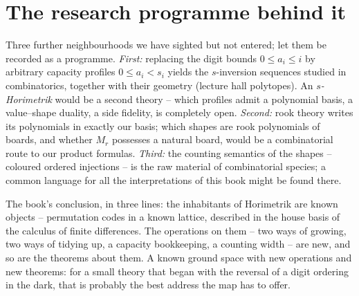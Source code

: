 \section{The research programme behind it}

Three further neighbourhoods we have sighted but not entered; let
them be recorded as a programme. \emph{First:} replacing the digit
bounds $0\le a_i\le i$ by arbitrary capacity profiles
$0\le a_i<s_i$ yields the $s$-inversion sequences studied in
combinatorics, together with their geometry (lecture hall
polytopes). An \emph{$s$-Horimetrik} would be a second theory --
which profiles admit a polynomial basis, a value--shape duality, a
side fidelity, is completely open. \emph{Second:} rook theory
writes its polynomials in exactly our basis; which shapes are rook
polynomials of boards, and whether $M_r$ possesses a natural
board, would be a combinatorial route to our product formulas.
\emph{Third:} the counting semantics of the shapes -- coloured
ordered injections -- is the raw material of combinatorial
species; a common language for all the interpretations of this
book might be found there.

\begin{oberflaeche}
The book's conclusion, in three lines: the inhabitants of
Horimetrik are known objects -- permutation codes in a known
lattice, described in the house basis of the calculus of finite
differences. The operations on them -- two ways of growing, two
ways of tidying up, a capacity bookkeeping, a counting width --
are new, and so are the theorems about them. A known ground space
with new operations and new theorems: for a small theory that
began with the reversal of a digit ordering in the dark, that is
probably the best address the map has to offer.
\end{oberflaeche}
